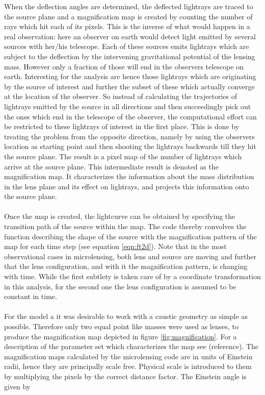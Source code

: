 When the deflection angles are determined, the deflected lightrays are traced to the source plane and a magnification map is created by counting the number of rays which hit each of its pixels. This is the inverse of what would happen in a real observation: here an observer on earth would detect light emitted by several sources with her/his telescope. Each of these sources emits lightrays which are subject to the deflection by the intervening gravitational potential of the lensing mass. However only a fraction of those will end in the observers telescope on earth. Interesting for the analysis are hence those lightrays which are originating by the source of interest and further the subset of these which actually converge at the location of the observer. So instead of calculating the trajectories of lightrays emitted by the source in all directions and then succeedingly pick out the ones which end in the telescope of the observer, the computational effort can be restricted to these lightrays of interest in the first place. This is done by treating the problem from the opposite direction, namely by using the observers location as starting point and then shooting the lightrays backwards till they hit the source plane. The result is a pixel map of the number of lightrays which arrive at the source plane. This intermediate result is denoted as the magnification map. It characterizes the information about the mass distribution in the lens plane and its effect on lightrays, and projects this information onto the source plane. \\\\
Once the map is created, the lightcurve can be obtained by specifying the transition path of the source within the map. The code thereby convolves the function describing the shape of the source with the magnification pattern of the map for each time step (see equation \ref{eqn:ft2d}). Note that in the most observational cases in microlensing, both lens and source are moving and further that the lens configuration, and with it the magnification pattern, is changing with time. While the first subtlety is taken care of by a coordinate transformation in this analysis, for the second one the lens configuration is assumed to be constant in time.  \\\\
For the model a it was desirable to work with a caustic geometry as simple as possible. Therefore only two equal point like masses were used as lenses, to produce the magnification map depicted in figure \ref{fig:magnification}. For a description of the parameter set which characterizes the map see (reference). The magnification maps calculated by the microlensing code are in units of Einstein radii, hence they are principally scale free. Physical scale is introduced to them by multiplying the pixels by the correct distance factor. The Einstein angle is given by   
